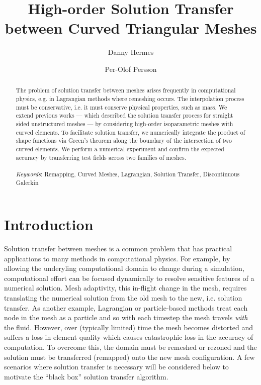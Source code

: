 \documentclass[oneside, reqno]{amsart}
\theoremstyle{definition}
\begin{document}
\title{High-order Solution Transfer between Curved Triangular Meshes}

\author{Danny Hermes}

\author{Per-Olof Persson}
\address{UC Berkeley, 970 Evans Hall \#3840, Berkeley, CA 94720-3840 USA}

\begin{abstract}
\noindent The problem of solution transfer between meshes arises frequently in
computational physics, e.g. in Lagrangian methods where remeshing
occurs. The interpolation process must be conservative, i.e. it
must conserve physical properties, such as mass. We extend previous
works --- which described the solution transfer process for straight sided
unstructured meshes --- by considering high-order isoparametric meshes
with curved elements. To facilitate solution transfer, we numerically
integrate the product of shape functions via Green's theorem along the
boundary of the intersection of two curved elements. We perform a numerical
experiment and confirm the expected accuracy by transferring test fields
across two families of meshes.
\\ \\
\noindent \emph{Keywords}: Remapping, Curved Meshes, Lagrangian,
Solution Transfer, Discontinuous Galerkin
\end{abstract}

\maketitle

\section{Introduction}

Solution transfer between meshes is a common problem that
has practical applications to many methods in
computational physics. For example, by allowing the underyling
computational domain to change during a simulation, computational
effort can be focused dynamically to resolve sensitive features
of a numerical solution. Mesh adaptivity, this in-flight change in the mesh,
requires translating the numerical solution from the old mesh to the new,
i.e. solution transfer. As another example, Lagrangian or particle-based
methods treat each node in the mesh as a particle and so with each timestep the
mesh travels \emph{with} the fluid.
However, over (typically limited) time the mesh
becomes distorted and suffers a loss in element quality which causes
catastrophic loss in the accuracy of computation. To overcome this, the
domain must be remeshed or rezoned and the solution must be
transferred (remapped) onto the new mesh configuration. A few scenarios
where solution transfer is necessary will be considered below
to motivate the ``black box'' solution transfer algorithm.
\end{document}
